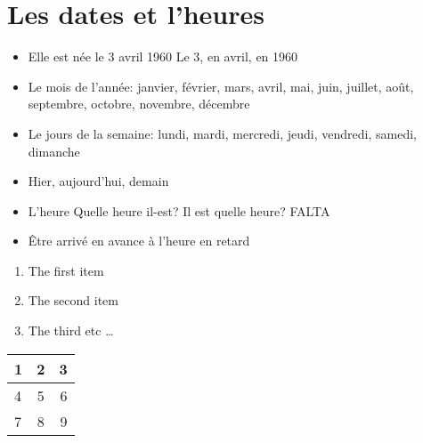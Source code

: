 \documentclass[12pt]{article}  %
\begin{document}
\section{Les dates et l'heures}

\begin{itemize}
  \item Elle est née le 3 avril 1960  
  	\subitem Le 3, en avril, en 1960
  \item Le mois de l'année:   
  	\subitem janvier, février, mars, avril, mai, juin, juillet, août, septembre, octobre, novembre, décembre
  \item Le jours de la semaine:   
  	\subitem lundi, mardi, mercredi, jeudi, vendredi, samedi, dimanche
  \item Hier, aujourd'hui, demain
  \item L'heure
    \subitem Quelle heure il-est? Il est quelle heure?
    FALTA
  \item Être arrivé
  	\subitem en avance
  	\subitem à l'heure
  	\subitem en retard
\end{itemize}

\begin{enumerate}
  \item The first item
  \item The second item
  \item The third etc \ldots
\end{enumerate}

\begin{tabular}{|  l  | c | r | }
  \hline                       
  1 & 2 & 3 \\ \hline
  4 & 5 & 6 \\ \hline
  7 & 8 & 9 \\
  \hline  
\end{tabular}
\end{document}
